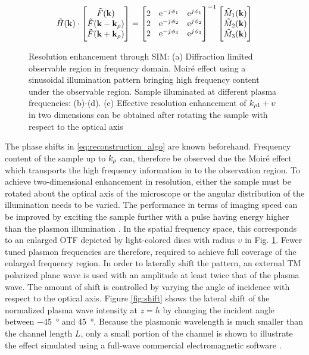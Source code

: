 \documentclass[11pt]{article}
\begin{document}
%
\begin{equation}
  \tilde{H}(\mathbf{k}) \cdot
  \begin{bmatrix}
    \tilde{F}(\mathbf{k}) \\
    \tilde{F}(\mathbf{k} - \mathbf{k}_{\rho}) \\
    \tilde{F}(\mathbf{k} + \mathbf{k}_{\rho})
  \end{bmatrix}
  =
  \begin{bmatrix}
    2 & \mathrm{e}^{-j\mkern1mu \phi_1} & \mathrm{e}^{j\mkern1mu \phi_1} \\
    2 & \mathrm{e}^{-j\mkern1mu \phi_2} & \mathrm{e}^{j\mkern1mu \phi_2} \\
    2 & \mathrm{e}^{-j\mkern1mu \phi_3} & \mathrm{e}^{j\mkern1mu \phi_3} \\
  \end{bmatrix}^{-1}
  \begin{bmatrix}
   \tilde{M}_1(\mathbf{k}) \\
   \tilde{M}_2(\mathbf{k}) \\
   \tilde{M}_3(\mathbf{k})
  \end{bmatrix}
  \label{eq:reconstruction_algo}
\end{equation}
%
\begin{figure}[t!]
  \centering
  \def\svgwidth{.75\linewidth}
  
  \caption{Resolution enhancement through SIM: (a) Diffraction limited observable region in frequency domain.  Moiré effect using a sinusoidal illumination pattern bringing high frequency content under the observable region. Sample illuminated at different plasma frequencies: (b)-(d). (e) Effective resolution enhancement of $k_{\rho 1} + \upsilon$ in two dimensions can be obtained after rotating the sample with respect to the optical axis}
  \label{fig:sim}
\end{figure}
%
The phase shifts in \eqref{eq:reconstruction_algo} are known beforehand. Frequency content of the sample up to $k_{\rho}$ can, therefore be observed due the Moiré effect which transports the high frequency information in to the observation region. To achieve two-dimensional enhancement in resolution, either the sample must be rotated about the optical axis of the microscope or the angular distribution of the illumination needs to be varied. The performance in terms of imaging speed can be improved by exciting the sample further with a pulse having energy higher than the plasmon illumination \cite{Zeng2015}. In the spatial frequency space, this corresponds to an enlarged OTF depicted by light-colored discs with radius $\upsilon$ in Fig. \ref{fig:sim}. Fewer tuned plasmon frequencies are therefore, required to achieve full coverage of the enlarged frequency region.
%
In order to laterally shift the pattern, an external TM polarized plane wave is used with an amplitude at least twice that of the plasma wave. The amount of shift is controlled by varying the angle of incidence with respect to the optical axis. Figure \ref{fig:shift} shows the lateral shift of the normalized plasma wave intensity at $z = h$ by changing the incident angle between \SI{-45}{\degree} and \SI{45}{\degree}. Because the plasmonic wavelength is much smaller than the channel length $L$, only a small portion of the channel is shown to illustrate the effect simulated using a full-wave commercial electromagnetic software \cite{comsol}.
\end{document}
